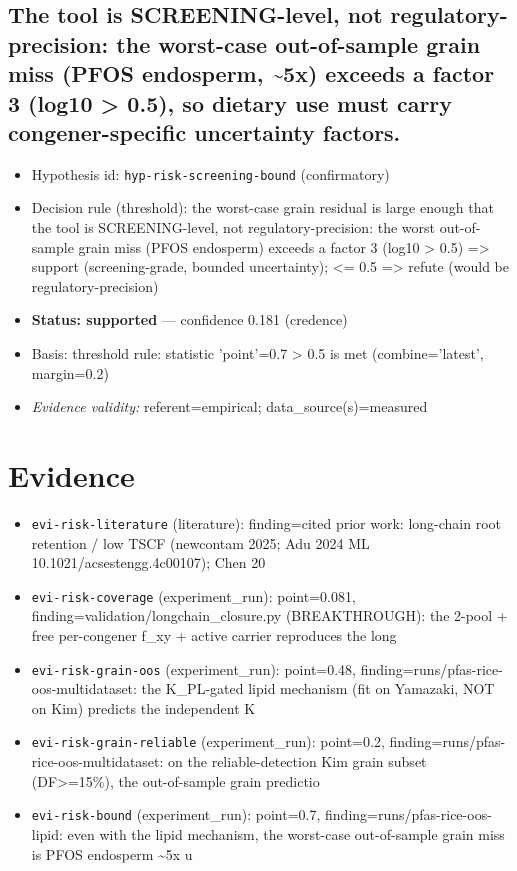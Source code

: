 \documentclass{article}
\begin{document}
\subsection{The tool is SCREENING-level, not regulatory-precision: the worst-case out-of-sample grain miss (PFOS endosperm, \textasciitilde{}5x) exceeds a factor 3 (log10 > 0.5), so dietary use must carry congener-specific uncertainty factors.}
\begin{itemize}
  \item Hypothesis id: \texttt{hyp-risk-screening-bound} (confirmatory)
  \item Decision rule (threshold): the worst-case grain residual is large enough that the tool is SCREENING-level, not regulatory-precision: the worst out-of-sample grain miss (PFOS endosperm) exceeds a factor 3 (log10 > 0.5) => support (screening-grade, bounded uncertainty); <= 0.5 => refute (would be regulatory-precision)
  \item \textbf{Status: supported} --- confidence 0.181 (credence)
  \item Basis: threshold rule: statistic 'point'=0.7 > 0.5 is met (combine='latest', margin=0.2)
  \item \textit{Evidence validity:} referent=empirical; data\_source(s)=measured
\end{itemize}

\section{Evidence}
\begin{itemize}
  \item \texttt{evi-risk-literature} (literature): finding=cited prior work: long-chain root retention / low TSCF (newcontam 2025; Adu 2024 ML 10.1021/acsestengg.4c00107); Chen 20
  \item \texttt{evi-risk-coverage} (experiment\_run): point=0.081, finding=validation/longchain\_closure.py (BREAKTHROUGH): the 2-pool + free per-congener f\_xy + active carrier reproduces the long
  \item \texttt{evi-risk-grain-oos} (experiment\_run): point=0.48, finding=runs/pfas-rice-oos-multidataset: the K\_PL-gated lipid mechanism (fit on Yamazaki, NOT on Kim) predicts the independent K
  \item \texttt{evi-risk-grain-reliable} (experiment\_run): point=0.2, finding=runs/pfas-rice-oos-multidataset: on the reliable-detection Kim grain subset (DF>=15\%), the out-of-sample grain predictio
  \item \texttt{evi-risk-bound} (experiment\_run): point=0.7, finding=runs/pfas-rice-oos-lipid: even with the lipid mechanism, the worst-case out-of-sample grain miss is PFOS endosperm \textasciitilde{}5x u
\end{itemize}
\end{document}
